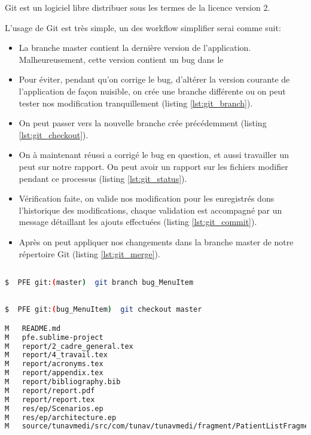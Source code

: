 Git est un logiciel libre distribuer sous les termes de la licence   version 2.

L'usage de Git est très simple, un des workflow simplifier serai comme suit:

\begin{itemize}

\item La branche master contient la dernière version de l'application. Malheureusement, cette version contient un bug dans le 

\item Pour éviter, pendant qu'on corrige le bug, d'altérer la version courante de  l'application de façon nuisible, on crée une branche différente ou on peut tester nos modification tranquillement (listing \ref{lst:git_branch}).

\item On peut passer vers la nouvelle branche crée précédemment (listing \ref{lst:git_checkout}).

\item On à maintenant réussi a corrigé le bug en question, et aussi travailler un peut sur notre rapport. On peut avoir un rapport sur les fichiers modifier pendant ce processus (listing \ref{lst:git_status}).

\item Vérification faite, on valide nos modification pour les enregistrés dons l'historique des modifications, chaque validation est accompagné par un message détaillant les ajouts effectuées (listing \ref{lst:git_commit}).

\item Après on peut appliquer nos changements dans la branche master de notre répertoire Git (listing \ref{lst:git_merge}).

\end{itemize}

\begin{lstlisting}[language=bash, label=lst:git_branch, caption=Git Branch]

$  PFE git:(master)  git branch bug_MenuItem

\end{lstlisting}

\begin{lstlisting}[language=bash, label=lst:git_checkout, caption=Git checkout]

$  PFE git:(bug_MenuItem)  git checkout master

M   README.md
M   pfe.sublime-project
M   report/2_cadre_general.tex
M   report/4_travail.tex
M   report/acronyms.tex
M   report/appendix.tex
M   report/bibliography.bib
M   report/report.pdf
M   report/report.tex
M   res/ep/Scenarios.ep
M   res/ep/architecture.ep
M   source/tunavmedi/src/com/tunav/tunavmedi/fragment/PatientListFragment.java

\end{lstlisting}

